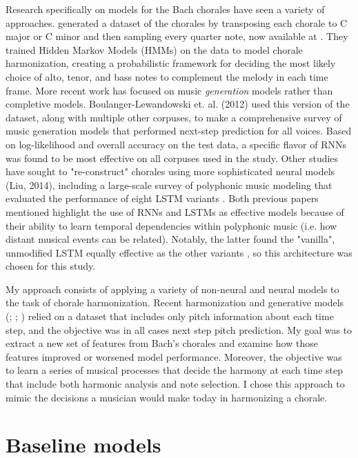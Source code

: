 \documentclass[11pt]{article}
\begin{document}
Research specifically on models for the Bach chorales have seen a variety of approaches. \citet{allan2005harmonising} generated a dataset of the chorales by transposing each chorale to C major or C minor and then sampling every quarter note, now available at \JSBChorales. They trained Hidden Markov Models (HMMs) on the data to model chorale harmonization, creating a probabilistic framework for deciding the most likely choice of alto, tenor, and bass notes to complement the melody in each time frame. More recent work has focused on music \textit{generation} models rather than completive models. Boulanger-Lewandowski et. al. (2012) used this version of the dataset, along with multiple other corpuses, to make a comprehensive survey of music generation models that performed next-step prediction for all voices. Based on log-likelihood and overall accuracy on the test data, a specific flavor of RNNs was found to be most effective on all corpuses used in the study. Other studies have sought to "re-construct" chorales using more sophisticated neural models (Liu, 2014), including a large-scale survey of polyphonic music modeling that evaluated the performance of eight LSTM variants \citet{greff2015lstm}. Both previous papers mentioned highlight the use of RNNs and LSTMs as effective models because of their ability to learn temporal dependencies within polyphonic music (i.e. how distant musical events can be related). Notably, the latter found the "vanilla", unmodified LSTM equally effective as the other variants \citep[p.~7]{greff2015lstm}, so this architecture was chosen for this study.

My approach consists of applying a variety of non-neural and neural models to the task of chorale harmonization. Recent harmonization and generative models (\cite{allan2005harmonising}; \cite{kaliakatsos2014}; \cite{greff2015lstm}) relied on a dataset that includes only pitch information about each time step, and the objective was in all cases next step pitch prediction. My goal was to extract a new set of features from Bach's chorales and examine how those features improved or worsened model performance. Moreover, the objective was to learn a series of musical processes that decide the harmony at each time step that include both harmonic analysis and note selection. I chose this approach to mimic the decisions a musician would make today in harmonizing a chorale.

\section{Baseline models}
\end{document}

